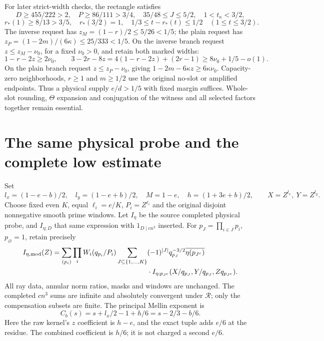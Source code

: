 \documentclass[11pt,a4paper]{article}
\theoremstyle{definition}
\begin{document}
For later strict-width checks, the rectangle satisfies
\[
 D\ge455/222>2,\quad P\ge86/111>3/4,\quad
 35/48\le J\le5/2,\quad 1<t_\kappa<3/2,
\]
\[
 r_*(1)\ge8/13>3/5,\quad r_*(3/2)=1,\quad
 1/3\le t-r_*(t)\le1/2\quad(1\le t\le3/2).
\]
The inverse request has $z_M=(1-r)/2\le5/26<1/5$;
the plain request has $z_P=(1-2m)/(6\kappa)\le25/333<1/5$.
On the inverse branch request $z\le z_M-\nu_0$, for a fixed
$\nu_0>0$, and retain both marked widths:
\[
 1-r-2z\ge2\nu_0,\qquad
 3-2r-8z
 =4(1-r-2z)+(2r-1)\ge8\nu_0+1/5-o(1).
\]
On the plain branch request $z\le z_P-\nu_0$, giving
$1-2m-6\kappa z\ge6\kappa\nu_0$.
Capacity-zero neighborhoods, $r\ge1$ and $m\ge1/2$ use the
original no-slot or amplified endpoints.
Thus a physical supply $e/d>1/5$ with fixed margin suffices.
Whole-slot rounding, $\Theta$ expansion and conjugation of the
witness and all selected factors together remain essential.

\section{The same physical probe and the complete low estimate}
\label{sec:low}
Set
\begin{equation}\label{eq:geometry}
 l_x=(1-e-b)/2,\quad l_y=(1-e+b)/2,\quad
 M=1-e,\quad h=(1+3e+b)/2,\qquad X=Z^{l_x},\ Y=Z^{l_y}.
\end{equation}
Choose fixed even $K$, equal $\ell_i=e/K$, $P_i=Z^{\ell_i}$
and the original disjoint nonnegative smooth prime windows.
Let $I_\eta$ be the source completed physical probe, and
$I_{\eta;D}$ that same expression with $1_{D\mid cn^3}$ inserted.
For $p_J=\prod_{i\in J}p_i$, $p_\varnothing=1$, retain precisely
\[
\begin{split}
 I_{\eta,\rm mod}(Z)
 =\sum_{(p_i)}\prod_i W_i(q_{p_i}/P_i)
 \sum_{J\subseteq\{1,\ldots,K\}}&
 (-1)^{|J|}q_{p_J}^{-3/2}\overline{\eta(p_{J^c})}\\
 &\cdot I_{\eta;p_{J^c}}
 (X/q_{p_J},Y/q_{p_J},Zq_{p_{J^c}}).
\end{split}
\]
All ray data, annular norm ratios, masks and windows are unchanged.
The completed $cn^3$ sums are infinite and absolutely convergent
under $\mathcal R$; only the compensation subsets are finite.
The principal Mellin exponent is
\begin{equation}\label{eq:C}
 C_b(s)=s+l_x/2-1+h/6=s-2/3-b/6 .
\end{equation}
Here the raw kernel's $z$ coefficient is $h-e$, and the exact
tuple adds $e/6$ at the residue. The combined coefficient is
$h/6$; it is not charged a second $e/6$.
\end{document}
